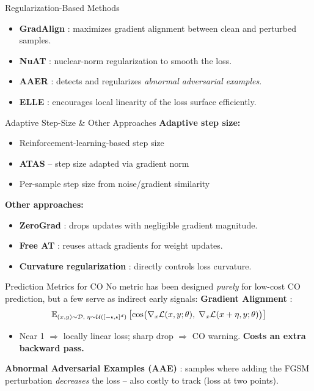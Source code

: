\documentclass[11pt,aspectratio=169]{beamer}
\begin{document}
\begin{frame}{Regularization-Based Methods}
  \begin{itemize}
    \item \textbf{GradAlign} \cite{andriushchenko2020understanding}: maximizes gradient alignment between clean and perturbed samples.
    \item \textbf{NuAT} \cite{sriramanan2021towards}: nuclear-norm regularization to smooth the loss.
    \item \textbf{AAER} \cite{lin2023eliminating}: detects and regularizes \emph{abnormal adversarial examples}.
    \item \textbf{ELLE} \cite{rocamora2024efficient}: encourages local linearity of the loss surface efficiently.
  \end{itemize}
\end{frame}

\begin{frame}{Adaptive Step-Size \& Other Approaches}
  \textbf{Adaptive step size:}
  \begin{itemize}
    \item Reinforcement-learning-based step size \cite{nie2021adaptive}
    \item \textbf{ATAS} -- step size adapted via gradient norm \cite{huang2023fast}
    \item Per-sample step size from noise/gradient similarity \cite{zhao2025avoiding}
  \end{itemize}
  \textbf{Other approaches:}
  \begin{itemize}
    \item \textbf{ZeroGrad} \cite{golgooni2023zerograd}: drops updates with negligible gradient magnitude.
    \item \textbf{Free AT} \cite{shafahi2019adversarial}: reuses attack gradients for weight updates.
    \item \textbf{Curvature regularization} \cite{moosavi2019robustness}: directly controls loss curvature.
  \end{itemize}
\end{frame}

\begin{frame}{Prediction Metrics for CO}
  No metric has been designed \emph{purely} for low-cost CO prediction, but a few serve as indirect early signals:
  \vskip 0.15cm
  \textbf{Gradient Alignment} \cite{andriushchenko2020understanding}:
  \[
  \small
  \mathbb{E}_{(x,y)\sim\mathcal{D},\; \eta\sim\mathcal{U}([-\epsilon,\epsilon]^d)} \left[ \cos\!\big( \nabla_x \mathcal{L}(x, y; \theta),\; \nabla_x \mathcal{L}(x+\eta, y; \theta) \big) \right]
  \]
  \begin{itemize}
    \item Near 1 $\Rightarrow$ locally linear loss; sharp drop $\Rightarrow$ CO warning. \textbf{Costs an extra backward pass.}
  \end{itemize}
  \textbf{Abnormal Adversarial Examples (AAE)} \cite{lin2023eliminating}: samples where adding the FGSM perturbation \emph{decreases} the loss -- also costly to track (loss at two points).
\end{frame}
\end{document}
